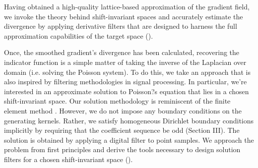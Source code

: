 Having obtained a high-quality lattice-based approximation of the
gradient field, we invoke the theory behind shift-invariant spaces
and accurately estimate the divergence by applying derivative filters
that are designed to harness the full approximation capabilities of
the target space (). 

Once, the smoothed gradient's divergence has been calculated, recovering the indicator
function is a simple matter of taking the inverse of the Laplacian over domain 
(i.e. solving the Poisson system). To do this, we take an approach that is also inspired 
by filtering methodologies in signal processing. In particular, we're interested in 
an approximate solution to Poisson?s equation that lies in a chosen shift-invariant 
space. Our solution methodology is reminiscent of the finite 
element method \cite{finite_el}. However, we do not impose any boundary 
conditions on the generating kernels. Rather, we satisfy homogeneous 
Dirichlet boundary conditions implicitly by requiring that the coefficient sequence be odd 
(Section III). The solution is obtained by applying a digital filter to point samples. 
We approach the problem from first principles and derive the tools necessary 
to design solution filters for a chosen shift-invariant space ().

